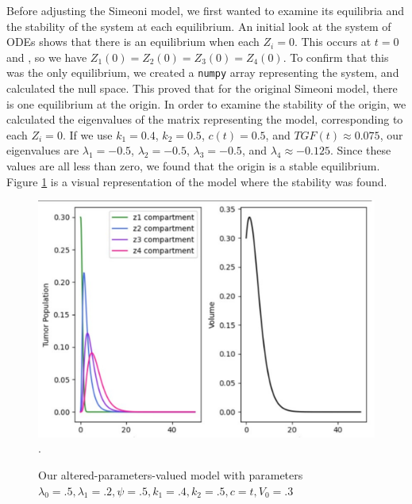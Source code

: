 \documentclass[11pt]{amsart}
\begin{document}
Before adjusting the Simeoni model, we first wanted to examine its equilibria and the stability of the system at each equilibrium. An initial look at the system of ODEs shows that there is an equilibrium when each $Z_i = 0$. This occurs at $t=0$ and , so we have $Z_1(0) = Z_2(0) = Z_3(0) = Z_4(0)$. To confirm that this was the only equilibrium, we created a \verb!numpy! array representing the system, and calculated the null space. This proved that for the original Simeoni model, there is one equilibrium at the origin. In order to examine the stability of the origin, we calculated the eigenvalues of the matrix representing the model, corresponding to each $Z_i = 0$. If we use $k_1 = 0.4$, $k_2 = 0.5$, $c(t) = 0.5$, and $TGF(t) \approx 0.075$, our eigenvalues are $\lambda_1 = -0.5$, $\lambda_2 = -0.5$, $\lambda_3 = -0.5$, and $\lambda_4 \approx -0.125$. Since these values are all less than zero, we found that the origin is a stable equilibrium. Figure \ref{fig:1} is a visual representation of the model where the stability was found.
\begin{figure}[h]

\begin{center} %
\includegraphics[width=\textwidth]{original_tumor_random_parameters.pdf}. %
\end{center}
\caption{Our altered-parameters-valued model with parameters $\lambda_0=.5, \lambda_1=.2, \psi=.5, k_1 = .4, k_2=.5, c=t, V_0 = .3$}
\label{fig:1}
\end{figure}
\end{document}

